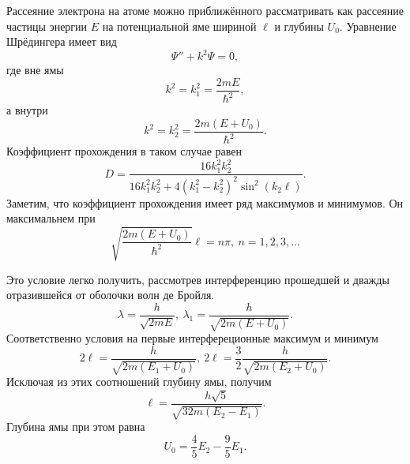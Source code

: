 \documentclass[a4paper]{article}
\begin{document}
Рассеяние электрона на атоме можно приближённого рассматривать как рассеяние частицы энергии $E$ на потенциальной яме шириной $\ell$ и глубины $U_0$. Уравнение Шрёдингера имеет вид
\[\Psi'' + k^2 \Psi = 0,\]
где вне ямы 
\[k^2 = k_1^2 = \dfrac{2mE}{\hbar^2},\]
а внутри 
\[k^2 = k_2^2 = \dfrac{2m(E+U_0)}{\hbar^2}.\]
Коэффициент прохождения в таком случае равен
\[D = \dfrac{16 k_1^2 k_2^2}{16k_1^2 k_2^2 + 4(k_1^2 - k_2^2)^2\sin^2(k_2\ell)}.\]
Заметим, что коэффициент прохождения имеет ряд максимумов и минимумов. Он максимальнем при
\begin{equation}\label{0}
\sqrt{\dfrac{2m(E+U_0)}{\hbar^2}}\ell = n\pi,~n=1,2,3,\dots
\end{equation}

Это условие легко получить, рассмотрев интерференцию прошедшей и дважды отразившейся от оболочки волн де Бройля. 
\[\lambda = \dfrac{h}{\sqrt{2mE}},~\lambda_1 = \dfrac{h}{\sqrt{2m(E+U_0)}}.\]
Соответственно условия на первые интерфереционные максимум и минимум 
\begin{equation}\label{1}
2\ell = \dfrac{h}{\sqrt{2m(E_1 + U_0)}},~2\ell = \dfrac{3}{2}\dfrac{h}{\sqrt{2m(E_2 + U_0)}}.
\end{equation}
Исключая из этих соотношений глубину ямы, получим
\begin{equation}\label{2}
\ell = \dfrac{h\sqrt{5}}{\sqrt{32m(E_2 - E_1)}}.
\end{equation}
Глубина ямы при этом равна
\begin{equation}\label{4}
U_0 = \dfrac{4}{5}E_2 - \dfrac{9}{5}E_1.
\end{equation}
\end{document}
